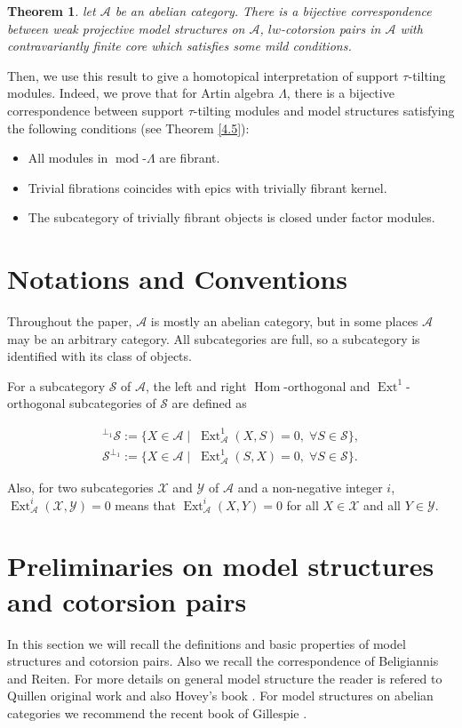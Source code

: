 \documentclass[12pt]{amsart}
\numberwithin{equation}{section}
\newtheorem{theorem}[lemma]{Theorem}
\theoremstyle{definition}
\DeclareMathOperator{\modd}{mod}
\DeclareMathOperator{\Hom}{Hom}
\DeclareMathOperator{\Ext}{Ext}
\newtheorem*{theorem 0*}{Theorem}
\newtheorem*{theorem a*}{Theorem A}
\newtheorem*{theorem b*}{Theorem B}
\numberwithin{diagram}{section}
\begin{document}
\begin{theorem}\label{1.2}
let $\mathcal{A}$ be an abelian category.
There is a bijective correspondence between weak projective model structures on $\mathcal{A}$, $lw$-cotorsion pairs in $\mathcal{A}$ with contravariantly finite core which satisfies some mild conditions.
\end{theorem}
Then, we use this result to give a homotopical interpretation of support $\tau$-tilting modules. Indeed, we prove that for Artin algebra $\Lambda$, there is a bijective correspondence between support $\tau$-tilting modules and model structures satisfying the following conditions (see Theorem \ref{4.5}):
   \begin{itemize}
\item[(i)]
All modules in $\modd\text{-}\Lambda$ are fibrant.
\item[(ii)]
Trivial fibrations coincides with epics with trivially fibrant kernel.
\item[(iii)]
The subcategory of trivially fibrant objects is closed under factor modules.
\end{itemize}
    
    \section*{Notations and Conventions} 
 Throughout the paper, $\mathcal{A}$ is mostly an abelian category, but in some places $\mathcal{A}$ may be an arbitrary category. All subcategories are full, so a subcategory is identified with its class of objects.

For a subcategory $\mathcal{S}$ of $\mathcal{A}$, the left and right $\Hom$-orthogonal and $\Ext^1$-orthogonal subcategories of $\mathcal{S}$ are defined as

\begin{align*}
{}^{\perp_1}\mathcal{S}:=\{X\in \mathcal{A}\mid\; \Ext^1_{\mathcal{A}}(X,S)=0,\; \forall S\in \mathcal{S}\},\\
\mathcal{S}^{\perp_1}:=\{X\in \mathcal{A}\mid\; \Ext^1_{\mathcal{A}}(S,X)=0,\; \forall S\in \mathcal{S}\}.
\end{align*}
 
Also, for two subcategories $\mathcal{X}$ and $\mathcal{Y}$ of $\mathcal{A}$ and a non-negative integer $i$, $\Ext_{\mathcal{A}}^i(\mathcal{X},\mathcal{Y})=0$ means that $\Ext_{\mathcal{A}}^i(X,Y)=0$ for all $X\in\mathcal{X}$ and all $Y\in\mathcal{Y}$.

\section{Preliminaries on model structures and cotorsion pairs}
In this section we will recall the definitions and basic properties of model structures and cotorsion pairs. Also we recall the correspondence of Beligiannis and Reiten.
For more details on general model structure the reader is refered to Quillen original work \cite{Q1} and also Hovey's book \cite{H1}. For model structures on abelian categories we recommend the recent book of Gillespie \cite{G}.
\end{document}
